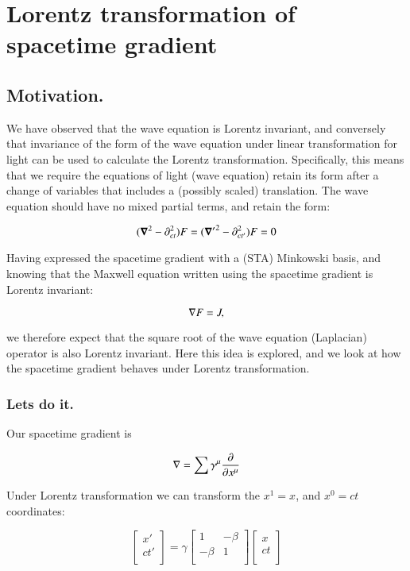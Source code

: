 \chapter{Lorentz transformation of spacetime gradient}

\section{Motivation. }

We have observed that the wave equation is Lorentz invariant, and conversely that invariance of the form of the wave equation under linear transformation for light can be used to calculate the Lorentz transformation.  Specifically, this means that we require the equations of light (wave equation) retain its form after a change of variables that includes
a (possibly scaled) translation.  The wave equation should have no mixed partial terms, and retain the form:

\begin{equation*}
(\boldsymbol{\nabla}^2 - \partial_{ct}^2) F = ({\boldsymbol{\nabla}'}^2 - \partial_{ct'}^2) F = 0
\end{equation*}

Having expressed the spacetime gradient with a (STA) Minkowski basis, and knowing that the Maxwell equation written using the spacetime gradient is Lorentz invariant:

\begin{equation*}
\nabla F = J,
\end{equation*}

we therefore expect that the square root of the wave equation (Laplacian) operator is also Lorentz invariant.  Here this idea is explored, and we look at how the spacetime
gradient behaves under Lorentz transformation.

\subsection{Lets do it. }

Our spacetime gradient is

\begin{equation*}
\nabla = \sum \gamma^{\mu} \frac{\partial}{\partial x^{\mu}}
\end{equation*}

Under Lorentz transformation we can transform the $x^1=x$, and $x^0 = ct$ coordinates:

\begin{equation*}
\begin{bmatrix}
x' \\
ct' \\
\end{bmatrix}
=
\gamma
\begin{bmatrix}
1 & -\beta \\
-\beta & 1 \\
\end{bmatrix}
\begin{bmatrix}
x \\
ct \\
\end{bmatrix}
\end{equation*}

